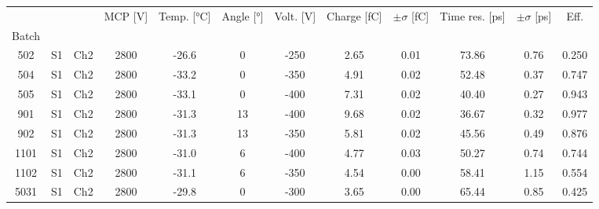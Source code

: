 \begin{tabular}{cccccccccccc}
\toprule
 &  &  & MCP [V] & Temp. [°C] & Angle [°] & Volt. [V] & Charge [fC] & \(\pm\sigma\) [fC] & Time res. [ps] & \(\pm\sigma\) [ps] & Eff. \\
Batch &  &  &  &  &  &  &  &  &  &  &  \\
\midrule
502 & S1 & Ch2 & 2800 & -26.6 & 0 & -250 & 2.65 & 0.01 & 73.86 & 0.76 & 0.250 \\
504 & S1 & Ch2 & 2800 & -33.2 & 0 & -350 & 4.91 & 0.02 & 52.48 & 0.37 & 0.747 \\
505 & S1 & Ch2 & 2800 & -33.1 & 0 & -400 & 7.31 & 0.02 & 40.40 & 0.27 & 0.943 \\
901 & S1 & Ch2 & 2800 & -31.3 & 13 & -400 & 9.68 & 0.02 & 36.67 & 0.32 & 0.977 \\
902 & S1 & Ch2 & 2800 & -31.3 & 13 & -350 & 5.81 & 0.02 & 45.56 & 0.49 & 0.876 \\
1101 & S1 & Ch2 & 2800 & -31.0 & 6 & -400 & 4.77 & 0.03 & 50.27 & 0.74 & 0.744 \\
1102 & S1 & Ch2 & 2800 & -31.1 & 6 & -350 & 4.54 & 0.00 & 58.41 & 1.15 & 0.554 \\
5031 & S1 & Ch2 & 2800 & -29.8 & 0 & -300 & 3.65 & 0.00 & 65.44 & 0.85 & 0.425 \\
\bottomrule
\end{tabular}
